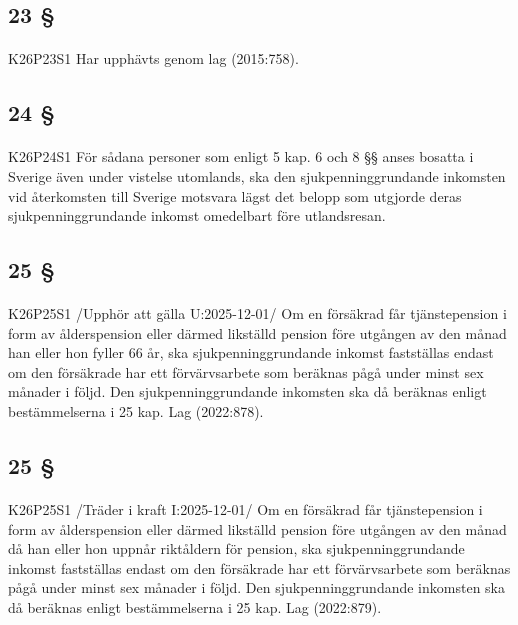 \documentclass[a4paper,notitlepage,openany,10pt]{book}
\begin{document}
\subsection*{23 §}
\paragraph*{}
{\tiny K26P23S1}
Har upphävts genom
lag (2015:758).
\subsection*{24 §}
\paragraph*{}
{\tiny K26P24S1}
För sådana personer som enligt 5 kap. 6 och 8 §§ anses bosatta i Sverige även under vistelse utomlands, ska den sjukpenninggrundande inkomsten vid återkomsten till Sverige motsvara lägst det belopp som utgjorde deras sjukpenninggrundande inkomst omedelbart före utlandsresan.
\subsection*{25 §}
\paragraph*{}
{\tiny K26P25S1}
/Upphör att gälla U:2025-12-01/
Om en försäkrad får tjänstepension i form av ålderspension eller därmed likställd pension före utgången av den månad han eller hon fyller 66 år, ska sjukpenninggrundande inkomst fastställas endast om den försäkrade har ett förvärvsarbete som beräknas pågå under minst sex månader i följd. Den sjukpenninggrundande inkomsten ska då beräknas enligt bestämmelserna i 25 kap.
Lag (2022:878).
\subsection*{25 §}
\paragraph*{}
{\tiny K26P25S1}
/Träder i kraft I:2025-12-01/
Om en försäkrad får tjänstepension i form av ålderspension eller därmed likställd pension före utgången av den månad då han eller hon uppnår riktåldern för pension, ska sjukpenninggrundande inkomst fastställas endast om den försäkrade har ett förvärvsarbete som beräknas pågå under minst sex månader i följd. Den sjukpenninggrundande inkomsten ska då beräknas enligt bestämmelserna i 25 kap.
Lag (2022:879).
\end{document}
